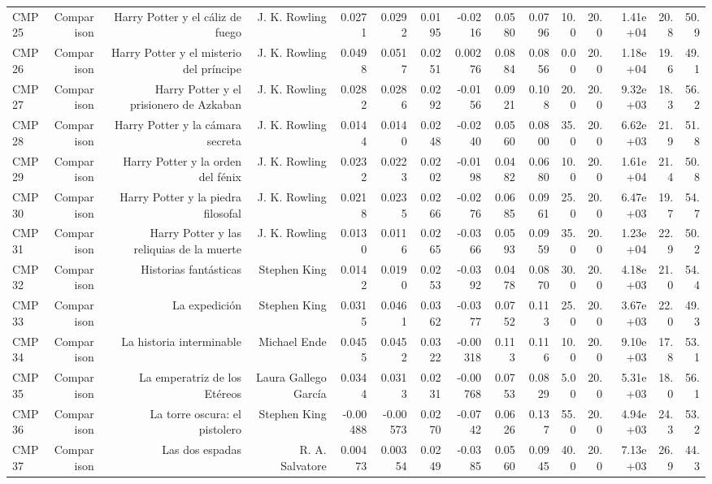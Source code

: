 \begin{table}[htbp]
\begin{tabular}{lrrrrrrrrrrrrrr}
CMP25 & Comparison & Harry Potter y el cáliz de fuego & J. K. Rowling & 0.0271 & 0.0292 & 0.0195 & -0.0216 & 0.0580 & 0.0796 & 10.0 & 20.0 & 1.41e+04 & 20.8 & 50.9 \\
CMP26 & Comparison & Harry Potter y el misterio del príncipe & J. K. Rowling & 0.0498 & 0.0517 & 0.0251 & 0.00276 & 0.0884 & 0.0856 & 0.00 & 20.0 & 1.18e+04 & 19.6 & 49.1 \\
CMP27 & Comparison & Harry Potter y el prisionero de Azkaban & J. K. Rowling & 0.0282 & 0.0286 & 0.0292 & -0.0156 & 0.0921 & 0.108 & 20.0 & 20.0 & 9.32e+03 & 18.3 & 56.2 \\
CMP28 & Comparison & Harry Potter y la cámara secreta & J. K. Rowling & 0.0144 & 0.0140 & 0.0248 & -0.0240 & 0.0560 & 0.0800 & 35.0 & 20.0 & 6.62e+03 & 21.9 & 51.8 \\
CMP29 & Comparison & Harry Potter y la orden del fénix & J. K. Rowling & 0.0232 & 0.0223 & 0.0202 & -0.0198 & 0.0482 & 0.0680 & 10.0 & 20.0 & 1.61e+04 & 21.4 & 50.8 \\
CMP30 & Comparison & Harry Potter y la piedra filosofal & J. K. Rowling & 0.0218 & 0.0235 & 0.0266 & -0.0276 & 0.0685 & 0.0961 & 25.0 & 20.0 & 6.47e+03 & 19.7 & 54.7 \\
CMP31 & Comparison & Harry Potter y las reliquias de la muerte & J. K. Rowling & 0.0130 & 0.0116 & 0.0265 & -0.0366 & 0.0593 & 0.0959 & 35.0 & 20.0 & 1.23e+04 & 22.9 & 50.2 \\
CMP32 & Comparison & Historias fantásticas & Stephen King & 0.0142 & 0.0190 & 0.0253 & -0.0392 & 0.0478 & 0.0870 & 30.0 & 20.0 & 4.18e+03 & 21.0 & 54.4 \\
CMP33 & Comparison & La expedición & Stephen King & 0.0315 & 0.0461 & 0.0362 & -0.0377 & 0.0752 & 0.113 & 25.0 & 20.0 & 3.67e+03 & 22.0 & 49.3 \\
CMP34 & Comparison & La historia interminable & Michael Ende & 0.0455 & 0.0452 & 0.0322 & -0.00318 & 0.113 & 0.116 & 10.0 & 20.0 & 9.10e+03 & 17.8 & 53.1 \\
CMP35 & Comparison & La emperatriz de los Etéreos & Laura Gallego García & 0.0344 & 0.0313 & 0.0231 & -0.00768 & 0.0753 & 0.0829 & 5.00 & 20.0 & 5.31e+03 & 18.0 & 56.1 \\
CMP36 & Comparison & La torre oscura: el pistolero & Stephen King & -0.00488 & -0.00573 & 0.0270 & -0.0742 & 0.0626 & 0.137 & 55.0 & 20.0 & 4.94e+03 & 24.3 & 53.2 \\
CMP37 & Comparison & Las dos espadas & R. A. Salvatore & 0.00473 & 0.00354 & 0.0249 & -0.0385 & 0.0560 & 0.0945 & 40.0 & 20.0 & 7.13e+03 & 26.9 & 44.3 \\

\end{tabular}
\end{table}
